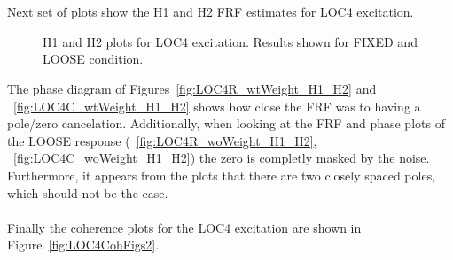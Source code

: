 \documentclass[paper=a4, fontsize=12pt]{scrartcl} %
\begin{document}
\\
\\
Next set of plots show the H1 and H2 FRF estimates for LOC4 excitation.
%
	\begin{figure}[H]
		\centering
		\quad
		\quad
		\quad
		\caption{H1 and H2 plots for LOC4 excitation. Results shown for FIXED and LOOSE condition.}
		\label{fig:LOC4H1H2Figs}
	\end{figure}
%
The phase diagram of Figures~\ref{fig:LOC4R_wtWeight_H1_H2} and ~\ref{fig:LOC4C_wtWeight_H1_H2} shows how close the FRF was to having a pole/zero cancelation. Additionally, when looking at the FRF and phase plots of the LOOSE response (~\ref{fig:LOC4R_woWeight_H1_H2}, ~\ref{fig:LOC4C_woWeight_H1_H2}) the zero is completly masked by the noise. Furthermore, it appears from the plots that there are two closely spaced poles, which should not be the case.
%
\\
\\
Finally the coherence plots for the LOC4 excitation are shown in Figure~\ref{fig:LOC4CohFigs2}.
%
\end{document}
